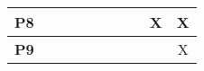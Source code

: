\begin{table}[b]
{\begin{tabular}{@{}cccccccccc@{}}
\multicolumn{1}{|c|}{\textbf{P8}} & \multicolumn{1}{c|}{}  & \multicolumn{1}{c|}{}  & \multicolumn{1}{c|}{}  & \multicolumn{1}{c|}{}  & \multicolumn{1}{c|}{}  & \multicolumn{1}{c|}{}  & \multicolumn{1}{c|}{}  & \multicolumn{1}{c|}{X} & \multicolumn{1}{c|}{X} \\ \midrule
\multicolumn{1}{|c|}{\textbf{P9}} & \multicolumn{1}{c|}{}  & \multicolumn{1}{c|}{}  & \multicolumn{1}{c|}{}  & \multicolumn{1}{c|}{}  & \multicolumn{1}{c|}{}  & \multicolumn{1}{c|}{}  & \multicolumn{1}{c|}{}  & \multicolumn{1}{c|}{}  & \multicolumn{1}{c|}{X} \\ \bottomrule
\end{tabular}
}
\end{table}
%
